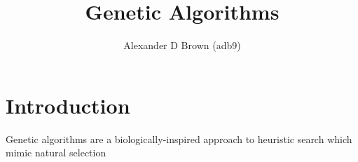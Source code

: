 \documentclass[11pt,a4paper,draft]{article}
\title{Genetic Algorithms}
\author{Alexander D Brown (adb9)}
\begin{document}
\maketitle
\tableofcontents

\newpage
\section{Introduction}
Genetic algorithms are a biologically-inspired approach to heuristic search 
which mimic natural selection 

\nocite{Man1996Genetic}
\nocite{Mitchell1996Introduction}


\end{document}

